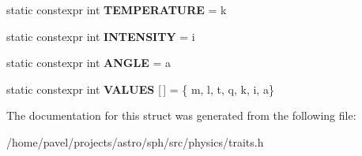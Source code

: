 \begin{DoxyCompactItemize}
static constexpr int {\bfseries T\+E\+M\+P\+E\+R\+A\+T\+U\+RE} = k
\item 
\hypertarget{structGetDimensions_3_01BaseUnit_3_01T_00_01m_00_01l_00_01t_00_01q_00_01k_00_01i_00_01a_01_4_01_4_abf996e46574b6f3f073bc026d8e313ba}{}\label{structGetDimensions_3_01BaseUnit_3_01T_00_01m_00_01l_00_01t_00_01q_00_01k_00_01i_00_01a_01_4_01_4_abf996e46574b6f3f073bc026d8e313ba} 
static constexpr int {\bfseries I\+N\+T\+E\+N\+S\+I\+TY} = i
\item 
\hypertarget{structGetDimensions_3_01BaseUnit_3_01T_00_01m_00_01l_00_01t_00_01q_00_01k_00_01i_00_01a_01_4_01_4_a88c750992770b16cceb782246f41492b}{}\label{structGetDimensions_3_01BaseUnit_3_01T_00_01m_00_01l_00_01t_00_01q_00_01k_00_01i_00_01a_01_4_01_4_a88c750992770b16cceb782246f41492b} 
static constexpr int {\bfseries A\+N\+G\+LE} = a
\item 
\hypertarget{structGetDimensions_3_01BaseUnit_3_01T_00_01m_00_01l_00_01t_00_01q_00_01k_00_01i_00_01a_01_4_01_4_a1693ad7b477667f6199484be41de095c}{}\label{structGetDimensions_3_01BaseUnit_3_01T_00_01m_00_01l_00_01t_00_01q_00_01k_00_01i_00_01a_01_4_01_4_a1693ad7b477667f6199484be41de095c} 
static constexpr int {\bfseries V\+A\+L\+U\+ES} \mbox{[}$\,$\mbox{]} = \{ m, l, t, q, k, i, a\}
\end{DoxyCompactItemize}


The documentation for this struct was generated from the following file\+:\begin{DoxyCompactItemize}
\item 
/home/pavel/projects/astro/sph/src/physics/traits.\+h\end{DoxyCompactItemize}
